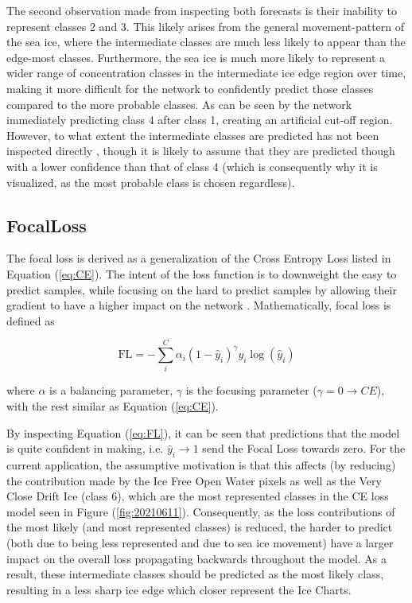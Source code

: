 \documentclass[../main/thesis]{subfiles}
\begin{document}
The second observation made from inspecting both forecasts is their inability to represent classes 2 and 3. This likely arises from the general movement-pattern of the sea ice, where the intermediate classes are much less likely to appear than the edge-most classes. Furthermore, the sea ice is much more likely to represent a wider range of concentration classes in the intermediate ice edge region over time, making it more difficult for the network to confidently predict those classes compared to the more probable classes. As can be seen by the network immediately predicting class 4 after class 1, creating an artificial cut-off region. However, to what extent the intermediate classes are predicted has not been inspected directly , though it is likely to assume that they are predicted though with a lower confidence than that of class 4 (which is consequently why it is visualized, as the most probable class is chosen regardless).



\subsection{FocalLoss}
The focal loss is derived as a generalization of the Cross Entropy Loss listed in Equation (\ref{eq:CE}). The intent of the loss function is to downweight the easy to predict samples, while focusing on the hard to predict samples by allowing their gradient to have a higher impact on the network \cite{Lin2017}. Mathematically, focal loss is defined as

\begin{equation}
    \label{eq:FL}
    \text{FL} = -\sum_i^C\alpha_i(1 - \hat{y}_i)^\gamma y_i\log{(\hat{y}_i)}
\end{equation}

where $\alpha$ is a balancing parameter, $\gamma$ is the focusing parameter ($\gamma = 0 \rightarrow CE$), with the rest similar as Equation (\ref{eq:CE}).

By inspecting Equation (\ref{eq:FL}), it can be seen that predictions that the model is quite confident in making, i.e. $\hat{y}_i \rightarrow 1$ send the Focal Loss towards zero. For the current application, the assumptive motivation is that this affects (by reducing) the contribution made by the Ice Free Open Water pixels as well as the Very Close Drift Ice (class 6), which are the most represented classes in the CE loss model seen in Figure (\ref{fig:20210611}). Consequently, as the loss contributions of the most likely (and most represented classes) is reduced, the harder to predict (both due to being less represented and due to sea ice movement) have a larger impact on the overall loss propagating backwards throughout the model. As a result, these intermediate classes should be predicted as the most likely class, resulting in a less sharp ice edge which closer represent the Ice Charts. 
\end{document}
